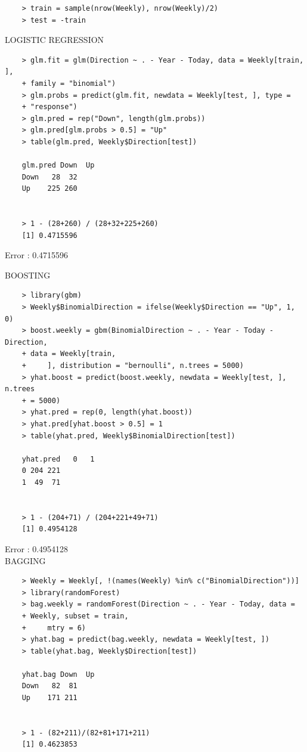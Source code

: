\documentclass{article}
\begin{document}
\begin{program}
	\begin{verbatim}
	> train = sample(nrow(Weekly), nrow(Weekly)/2)
	> test = -train
	\end{verbatim}
\end{program}

LOGISTIC REGRESSION

\begin{program}
	\begin{verbatim}
	> glm.fit = glm(Direction ~ . - Year - Today, data = Weekly[train, ],
	+ family = "binomial")
	> glm.probs = predict(glm.fit, newdata = Weekly[test, ], type =
	+ "response")
	> glm.pred = rep("Down", length(glm.probs))
	> glm.pred[glm.probs > 0.5] = "Up"
	> table(glm.pred, Weekly$Direction[test])
	
	glm.pred Down  Up
	Down   28  32
	Up    225 260


	> 1 - (28+260) / (28+32+225+260)
	[1] 0.4715596
	\end{verbatim}
\end{program}

Error : 0.4715596

\newpage

BOOSTING


\begin{program}
	\begin{verbatim}
	> library(gbm)
	> Weekly$BinomialDirection = ifelse(Weekly$Direction == "Up", 1, 0)
	> boost.weekly = gbm(BinomialDirection ~ . - Year - Today - Direction,
	+ data = Weekly[train,
	+     ], distribution = "bernoulli", n.trees = 5000)
	> yhat.boost = predict(boost.weekly, newdata = Weekly[test, ], n.trees
	+ = 5000)
	> yhat.pred = rep(0, length(yhat.boost))
	> yhat.pred[yhat.boost > 0.5] = 1
	> table(yhat.pred, Weekly$BinomialDirection[test])
	
	yhat.pred   0   1
	0 204 221
	1  49  71


	> 1 - (204+71) / (204+221+49+71)
	[1] 0.4954128
	\end{verbatim}
\end{program}

Error : 0.4954128 \\

BAGGING

\begin{program}
	\begin{verbatim}
	> Weekly = Weekly[, !(names(Weekly) %in% c("BinomialDirection"))]
	> library(randomForest)
	> bag.weekly = randomForest(Direction ~ . - Year - Today, data =
	+ Weekly, subset = train,
	+     mtry = 6)
	> yhat.bag = predict(bag.weekly, newdata = Weekly[test, ])
	> table(yhat.bag, Weekly$Direction[test])
	
	yhat.bag Down  Up
	Down   82  81
	Up    171 211


	> 1 - (82+211)/(82+81+171+211)
	[1] 0.4623853
	\end{verbatim}
\end{program}
\end{document}
